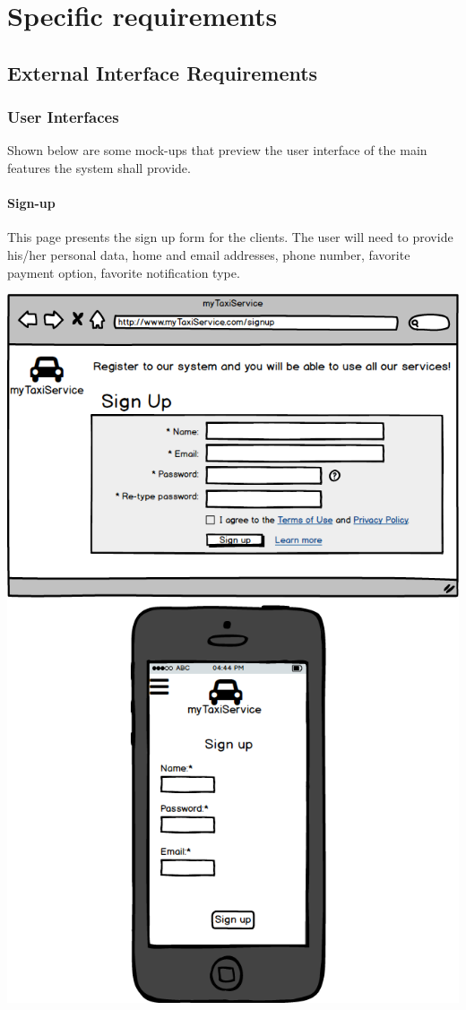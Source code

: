 \documentclass[a4paper,11pt]{report} %
\begin{document}
	
	\section{Specific requirements}
	
	\subsection{External Interface Requirements} 
	
	\subsubsection{User Interfaces} Shown below are some mock-ups that preview the user interface of the main features the system shall provide.
	
	\pagebreak
	\paragraph{Sign-up} This page presents the sign up form for the clients. The user will need to provide his/her personal data, home and email addresses, phone number, favorite payment option, favorite notification type.
	\begin{center}
		\includegraphics[width=0.9\linewidth]{Pictures/Signup}
	\end{center}
	\pagebreak
	
\end{document}

